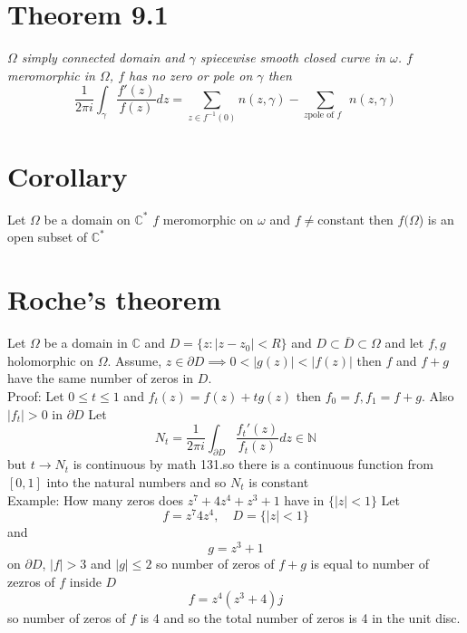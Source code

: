 \documentclass[11pt]{article}
\begin{document}
\section{Theorem 9.1}
\emph{
    $\Omega$ simply connected domain and  $\gamma$ spiecewise smooth closed curve in $\omega$.  $f$ 
    meromorphic in  $\Omega$,  $f$ has no zero or pole on  $\gamma$ then
    \[
    \frac{1}{2\pi i}\int_{\gamma}^{} \frac{f'(z)}{f(z)}dz = \sum_{z \in f^{-1}(0)}^{}n(z,\gamma) - \sum_{z \text{pole of $f$ }}^{}n(z,\gamma)
    \] 
} 

\section{Corollary}
Let $\Omega$ be a domain on  $ \mathbb{C}^{*}$ 
$f$ meromorphic on $\omega$ and  $f \ne $constant then  $f(\Omega$) is an open subset of  $ \mathbb{C}^{*}$

\section{Roche's theorem}
Let $\Omega$ be a domain in $ \mathbb{C}$ and $D = \{z : |z-z_0| < R\}$ and $D \subset \overline{D} \subset \Omega$ and let $f,g$ holomorphic on  $\Omega$.
Assume, $z \in \partial D \implies 0 < |g(z)| < |f(z)|$ then $f$ and $f +g$ have the same number of zeros in $ D$.\\
Proof: Let $0 \le t \le 1$ and  $f_t(z) = f(z) + tg(z)$ then  $f_0 = f, f_1 = f + g$. Also $|f_t| > 0$ in  $ \partial D$ Let
\[
N_t = \frac{1}{2\pi i} \int_{ \partial D}^{} \frac{f_t'(z)}{f_t(z)}dz \in \mathbb{N}
\] 
but $t \rightarrow N_t$ is continuous by math 131.so there is a continuous function from $[0,1]$  into the natural numbers and so  $N_t$ is constant\\
Example:
How many zeros does $z^{7} + 4z^{4} + z^{3} + 1$ have in $\{|z| < 1\}$
Let
 \[
     f = z^{7} 4z^{4}, \quad D = \{|z| < 1\}
\] 
and
\[
g = z^{3} + 1
\] 
on $\partial D$, $|f| > 3$ and  $|g| \le 2$ so number of zeros of  $f + g$ is equal to number of zezros of  $f$ inside  $D$
 \[
f = z^{4}(z^{3} + 4)j
\] 
so number of zeros of $f$ is 4 and so the total number of zeros is 4 in the unit disc.
\end{document}
